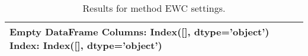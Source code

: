 \begin{table}
\centering
\caption{Results for method EWC settings.}
\begin{tabular}{l}
\toprule
Empty DataFrame
Columns: Index([], dtype='object')
Index: Index([], dtype='object') \\
\bottomrule
\end{tabular}
\end{table}
